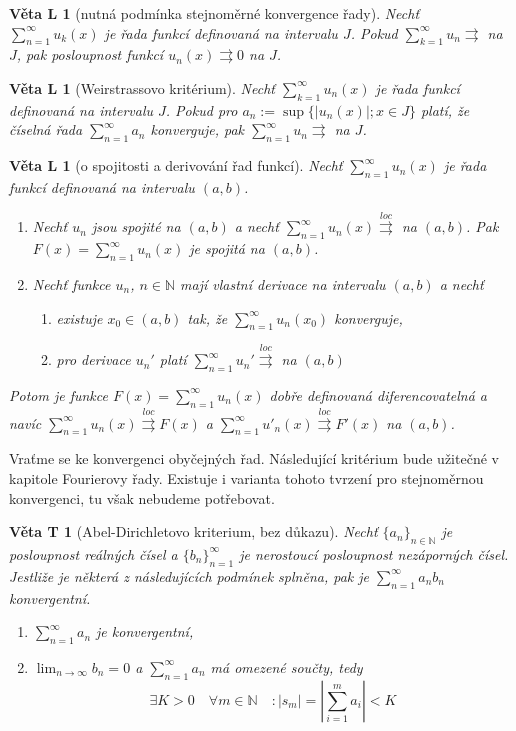 \documentclass[11pt,a4paper]{article}
\newcounter{vety}
\newtheorem{vetal}[vety]{Věta L}
\newtheorem{vetat}[vety]{Věta T}
\newcommand{\con}{\rightrightarrows}
\newcommand{\conloc}{\overset{loc}{\rightrightarrows}}
\begin{document}
\begin{vetal}[nutná podmínka stejnoměrné konvergence řady]
Nechť $\sum_{n=1}^{\infty} u_k (x)$ je řada funkcí definovaná na intervalu $J$. Pokud $\sum_{k=1}^{\infty} u_n \con$ na $J$, pak posloupnost funkcí $u_n (x) \con 0$ na $J$.
\end{vetal}

\begin{vetal}[Weirstrassovo kritérium]
Nechť $\sum_{k=1}^{\infty} u_n (x)$ je řada funkcí definovaná na intervalu $J$. Pokud pro $a_n := \sup \{ | u_n (x) |; x \in J \}$ platí, že číselná řada $\sum_{n=1}^{\infty} a_n$ konverguje, pak $\sum_{n=1}^{\infty} u_n \con$ na $J$.
\end{vetal}

\begin{vetal}[o spojitosti a derivování řad funkcí]
Nechť $\sum_{n=1}^{\infty} u_n (x)$ je řada funkcí definovaná na intervalu $(a,b)$.
\begin{enumerate}
\item Nechť $u_n$ jsou spojité na $(a,b)$ a nechť $\sum_{n=1}^{\infty} u_n (x) \conloc$ na $(a,b)$. Pak $F (x) = \sum_{n=1}^{\infty} u_n (x)$ je spojitá na $(a,b)$.
\item Nechť funkce $u_n$, $n \in \mathbb{N}$ mají vlastní derivace na intervalu $(a,b)$ a nechť
	\begin{enumerate}
	\item existuje $x_0 \in (a,b)$ tak, že $\sum_{n=1}^{\infty} u_n (x_0)$ konverguje,
	\item pro derivace $u_n'$ platí $\sum_{n=1}^{\infty} u_n' \conloc$ na $(a,b)$
	\end{enumerate}
\end{enumerate}
Potom je funkce $F(x) = \sum_{n=1}^{\infty} u_n (x)$ dobře definovaná diferencovatelná a navíc $\sum_{n=1}^{\infty} u_n (x) \conloc F(x)$ a $\sum_{n=1}^{\infty} u'_n (x) \conloc F'(x)$ na $(a,b)$.
\end{vetal}

Vraťme se ke konvergenci obyčejných řad. Následující kritérium bude užitečné v kapitole Fourierovy řady. Existuje i varianta tohoto tvrzení pro stejnoměrnou konvergenci, tu však nebudeme potřebovat.

\begin{vetat}[Abel-Dirichletovo kriterium, bez důkazu]
Nechť $\{a_n\}_{n \in \mathbb{N}}$ je posloupnost reálných čísel a $\{b_n\}_{n=1}^{\infty}$ je nerostoucí posloupnost nezáporných čísel. Jestliže je některá z následujících podmínek splněna, pak je $\sum_{n=1}^{\infty} a_n b_n$ konvergentní.
\begin{enumerate}
\item $\sum_{n=1}^{\infty} a_n$ je konvergentní,
\item $\lim_{n \rightarrow \infty} b_n = 0$ a $\sum_{n=1}^{\infty} a_n$ má omezené součty, tedy
$$\exists K > 0 \quad \forall m \in \mathbb{N} \quad : | s_m | = \left| \sum_{i=1}^{m} a_i  \right| < K$$
\end{enumerate}
\end{vetat}
\end{document}
